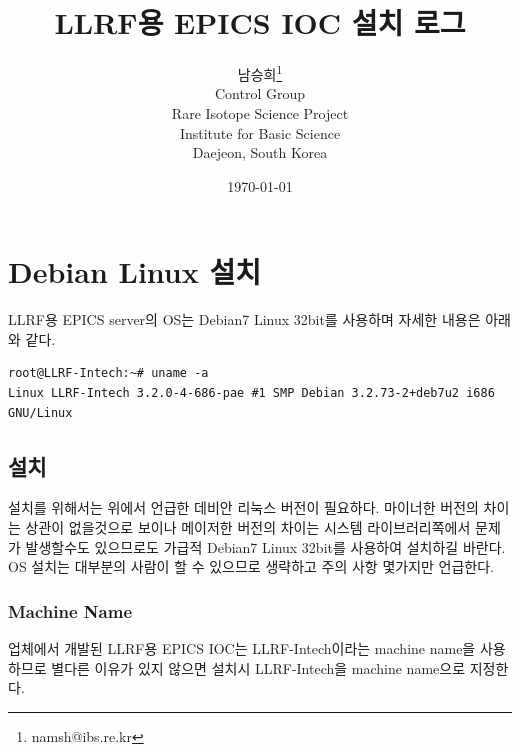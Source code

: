 \documentclass[11pt
  , a4paper
  , article
  , oneside
]{memoir}
\begin{document}
\newcommand{\technumber}{
  RAON Control-Document Series\\
  Revision : v0.1,   Release : 2016. 01. 15}
\title{\textbf{LLRF용 EPICS IOC 설치 로그}}



\author{남승희\thanks{namsh@ibs.re.kr} \\
  Control Group \\
  Rare Isotope Science Project\\
  Institute for Basic Science\\
  Daejeon, South Korea
}

\date{\today}

\renewcommand{\maketitlehooka}{\begin{flushright}\textsf{\technumber}\end{flushright}}

\maketitle





\chapter{Debian Linux 설치}
LLRF용 EPICS server의 OS는 Debian7 Linux 32bit를 사용하며 자세한 내용은 아래와 같다.
\begin{lstlisting}[style=termstyle]
root@LLRF-Intech:~# uname -a
Linux LLRF-Intech 3.2.0-4-686-pae #1 SMP Debian 3.2.73-2+deb7u2 i686 GNU/Linux
\end{lstlisting}
\section{설치}
설치를 위해서는 위에서 언급한 데비안 리눅스 버전이 필요하다. 마이너한 버전의 차이는 상관이 없을것으로 보이나 메이저한 버전의 차이는 시스템 라이브러리쪽에서 문제가 발생할수도 있으므로도 가급적 Debian7 Linux 32bit를 사용하여 설치하길 바란다. OS 설치는 대부분의 사람이 할 수 있으므로 생략하고 주의 사항 몇가지만 언급한다.
\subsection{Machine Name}
업체에서 개발된 LLRF용 EPICS IOC는 LLRF-Intech이라는 machine name을 사용하므로 별다른 이유가 있지 않으면 설치시 LLRF-Intech을 machine name으로 지정한다.
\end{document}
